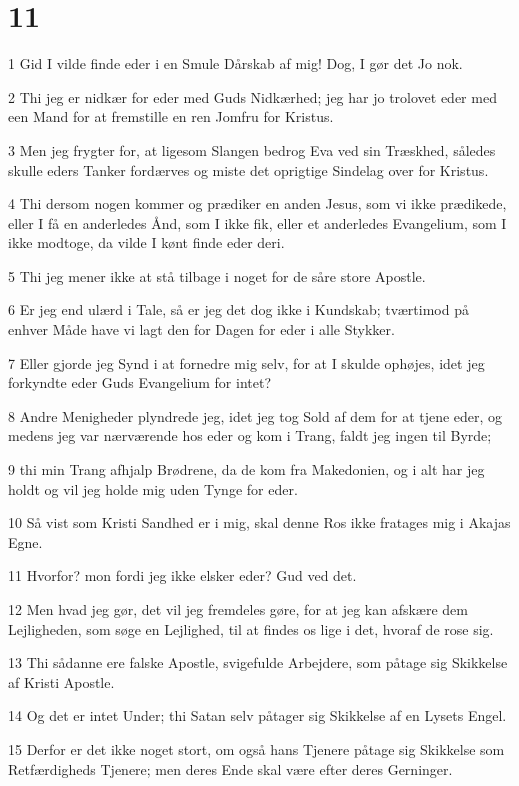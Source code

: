 \chapter{11}

\par 1 Gid I vilde finde eder i en Smule Dårskab af mig! Dog, I gør det Jo nok.
\par 2 Thi jeg er nidkær for eder med Guds Nidkærhed; jeg har jo trolovet eder med een Mand for at fremstille en ren Jomfru for Kristus.
\par 3 Men jeg frygter for, at ligesom Slangen bedrog Eva ved sin Træskhed, således skulle eders Tanker fordærves og miste det oprigtige Sindelag over for Kristus.
\par 4 Thi dersom nogen kommer og prædiker en anden Jesus, som vi ikke prædikede, eller I få en anderledes Ånd, som I ikke fik, eller et anderledes Evangelium, som I ikke modtoge, da vilde I kønt finde eder deri.
\par 5 Thi jeg mener ikke at stå tilbage i noget for de såre store Apostle.
\par 6 Er jeg end ulærd i Tale, så er jeg det dog ikke i Kundskab; tværtimod på enhver Måde have vi lagt den for Dagen for eder i alle Stykker.
\par 7 Eller gjorde jeg Synd i at fornedre mig selv, for at I skulde ophøjes, idet jeg forkyndte eder Guds Evangelium for intet?
\par 8 Andre Menigheder plyndrede jeg, idet jeg tog Sold af dem for at tjene eder, og medens jeg var nærværende hos eder og kom i Trang, faldt jeg ingen til Byrde;
\par 9 thi min Trang afhjalp Brødrene, da de kom fra Makedonien, og i alt har jeg holdt og vil jeg holde mig uden Tynge for eder.
\par 10 Så vist som Kristi Sandhed er i mig, skal denne Ros ikke fratages mig i Akajas Egne.
\par 11 Hvorfor? mon fordi jeg ikke elsker eder? Gud ved det.
\par 12 Men hvad jeg gør, det vil jeg fremdeles gøre, for at jeg kan afskære dem Lejligheden, som søge en Lejlighed, til at findes os lige i det, hvoraf de rose sig.
\par 13 Thi sådanne ere falske Apostle, svigefulde Arbejdere, som påtage sig Skikkelse af Kristi Apostle.
\par 14 Og det er intet Under; thi Satan selv påtager sig Skikkelse af en Lysets Engel.
\par 15 Derfor er det ikke noget stort, om også hans Tjenere påtage sig Skikkelse som Retfærdigheds Tjenere; men deres Ende skal være efter deres Gerninger.
